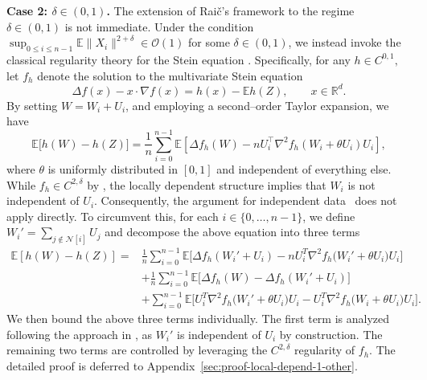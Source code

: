 \documentclass[mnsc,nonblindrev]{informs3}
\begin{document}
\noindent\textbf{Case 2: $\delta \in (0,1)$.} The extension of Rai\v{c}'s framework to the regime $\delta\in(0,1)$ is not immediate.
 Under the condition $\sup_{0\le i\le n-1}\mathbb{E}\|X_i\|^{2+\delta}\in \mathcal{O}(1)$ for some $\delta\in(0,1)$, we instead invoke the classical regularity theory for the Stein equation \citep{gallouet2018regularity}. Specifically, for any $h\in C^{0,1},$ let $f_h$ denote the solution to the multivariate Stein equation
\[
\Delta f(x)-x\cdot\nabla f(x)=h(x)-\mathbb{E}h(Z), \qquad x\in\mathbb{R}^d.
\]
By setting $W=W_i+U_i$, and employing a second–order Taylor expansion, we have
\[
\mathbb{E}\big[h(W)-h(Z)\big]
=\frac{1}{n}\sum_{i=0}^{n-1} \mathbb{E}\left[\Delta f_h(W)-nU_i^{\top}
\nabla^{2}f_h\left(W_i+\theta U_i\right)U_i\right],
\]
where $\theta$ is uniformly
distributed in $[0,1]$ and independent of everything else. While $f_h\in C^{2,\delta}$ by \cite{gallouet2018regularity}, the locally dependent structure implies that $W_i$ is not independent of $U_i$. Consequently, the argument for independent data~\citep{gallouet2018regularity}  does not apply directly. %
To circumvent this, for each $i \in \{0, \dots, n-1\}$, we define $W_i' = \sum_{j \notin \mathcal N[i]}U_j$ and decompose the above equation into three terms
\begin{equation}\label{eq:threeterm}
\begin{aligned}
\mathbb{E}[h(W)-h(Z)]=&\frac{1}{n} \sum_{i=0}^{n-1} \mathbb{E}\Big[\Delta f_h(W_i'+U_i)-nU_i^T \nabla^2 f_h\big(W_i'+\theta U_i\big) U_i\Big]\\
&+\frac{1}{n} \sum_{i=0}^{n-1}\mathbb{E}\Big[\Delta f_h(W)-\Delta f_h(W_i'+U_i)\Big]\\
&+\sum_{i=0}^{n-1}\mathbb{E}\Big[U_i^T \nabla^2 f_h\big(W_i'+\theta U_i\big) U_i-U_i^T \nabla^2 f_h\big(W_i+\theta U_i\big) U_i\Big].
\end{aligned}
\end{equation}
We then bound the above three terms individually. The first term is analyzed following the approach in \cite{gallouet2018regularity}, as \(W_i'\) is independent of \(U_i\) by construction. The remaining two terms are controlled by leveraging the \(C^{2,\delta}\) regularity of \(f_h\). The detailed proof is deferred to
Appendix~\ref{sec:proof-local-depend-1-other}.
\end{document}

